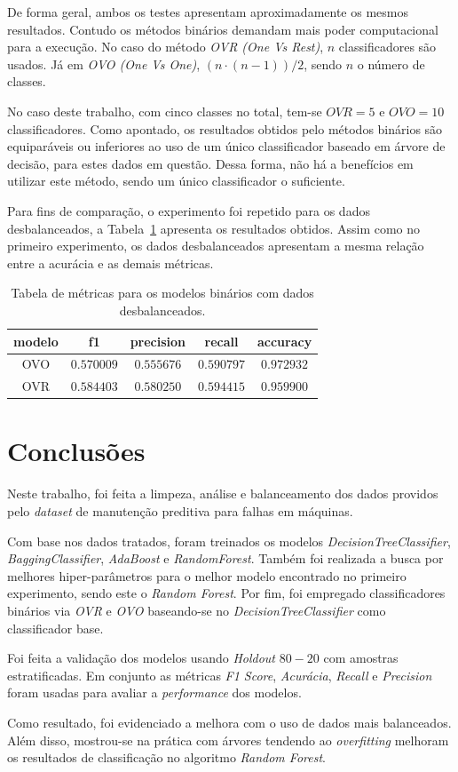 \documentclass{paper}
\begin{document}
De forma geral, ambos os testes apresentam aproximadamente os mesmos resultados. Contudo os métodos binários demandam mais poder computacional para a execução. No caso do método \textit{OVR (One Vs Rest)}, $n$ classificadores são usados. Já em \textit{OVO (One Vs One)}, $(n \cdot (n-1))/2$, sendo $n$ o número de classes. 

No caso deste trabalho, com cinco classes no total, tem-se $OVR = 5$ e $OVO = 10$ classificadores. Como apontado, os resultados obtidos pelo métodos binários são equiparáveis ou inferiores ao uso de um único classificador baseado em árvore de decisão, para estes dados em questão. Dessa forma, não há a benefícios em utilizar este método, sendo um único classificador o suficiente.

Para fins de comparação, o experimento foi repetido para os dados desbalanceados, a Tabela~\ref{tb:ovo-no-aug} apresenta os resultados obtidos. Assim como no primeiro experimento, os dados desbalanceados apresentam a mesma relação entre a acurácia e as demais métricas.

\begin{table}[h!] 
\centering
\begin{tabular}{ c | c c c c } 
 modelo & f1 & precision & recall & accuracy \\
\hline
OVO    & $0.570009$ &	$0.555676$ &	$0.590797$ &	$0.972932$ \\
OVR	   & $0.584403$ &	$0.580250$ &	$0.594415$ &	$0.959900$ 
\end{tabular}
\caption{Tabela de métricas para os modelos binários com dados desbalanceados.}
\label{tb:ovo-no-aug}
\end{table}

\section{Conclusões}

Neste trabalho, foi feita a limpeza, análise e balanceamento dos dados providos pelo \textit{dataset} de manutenção preditiva para falhas em máquinas.

Com base nos dados tratados, foram treinados os modelos \textit{DecisionTreeClassifier}, \textit{BaggingClassifier}, \textit{AdaBoost} e \textit{RandomForest}. Também foi realizada a busca por melhores hiper-parâmetros para o melhor modelo encontrado no primeiro experimento, sendo este o \textit{Random Forest}. Por fim, foi empregado classificadores binários via \textit{OVR} e \textit{OVO} baseando-se no \textit{DecisionTreeClassifier} como classificador base.

Foi feita a validação dos modelos usando \textit{Holdout} $80-20$ com amostras estratificadas. Em conjunto as métricas \textit{F1 Score}, \textit{Acurácia}, \textit{Recall} e \textit{Precision} foram usadas para avaliar a \textit{performance} dos modelos.

Como resultado, foi evidenciado a melhora com o uso de dados mais balanceados. Além disso, mostrou-se na prática com árvores tendendo ao \textit{overfitting} melhoram os resultados de classificação no algoritmo \textit{Random Forest}.



\end{document}
